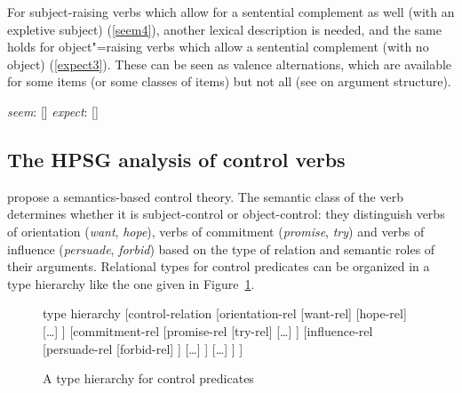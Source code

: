 \documentclass[output=paper
	        ,collection
	        ,collectionchapter
 	        ,biblatex
                ,babelshorthands
                ,newtxmath
                ,draftmode
                ,colorlinks, citecolor=brown
]{langscibook}
\begin{document}
\eal
{}
\zl

For subject-raising verbs which allow for a sentential complement as well (with an expletive
subject) (\ref{seem4}), another lexical description is needed, and the same holds for
object"=raising verbs which allow a sentential complement (with no object) (\ref{expect3}). These
can be seen as valence alternations, which are available for some items (or some classes of items)
but not all (see  on argument structure). 

\eal
\ex \emph{seem}:   [\argst {}]
\ex \emph{expect}: [\argst {}]
\zl

\subsection{The HPSG analysis of control verbs}

\citet{SagandPollard1991} propose a semantics-based control theory. The semantic class of the verb
determines whether it is subject-control or object-control: they distinguish verbs of orientation
(\emph{want}, \emph{hope}), verbs of commitment (\emph{promise}, \emph{try}) and verbs of influence
(\emph{persuade}, \emph{forbid}) based on the type of relation and semantic roles of their
arguments. Relational types for control predicates can be organized in a type hierarchy like the one
given in Figure~\ref{verb-hier3}.

\begin{figure}
	\begin{forest}type hierarchy
       [control-relation
      					[orientation-rel
      						[want-rel] 
      						 [hope-rel]
      						 [\ldots]   		
      					] 
      					[commitment-rel
      					 		[promise-rel
      					 			[try-rel]
      					 		[\ldots]
      					 	]
      					 	 [influence-rel
      					 		[persuade-rel
      					 			[forbid-rel]
      					 		]
      					 		[\ldots]
      					 	]
      					 	[\ldots]
      					]  
      	]
\end{forest}
\caption{\label{verb-hier3}A type hierarchy for control predicates}
\end{figure}
\end{document}
